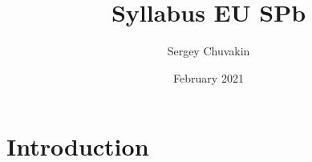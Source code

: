 \documentclass{article}
\title{Syllabus EU SPb}
\author{Sergey Chuvakin }
\date{February 2021}
\begin{document}
\maketitle

\section{Introduction}
\end{document}
